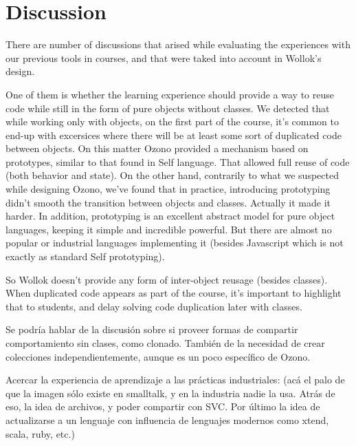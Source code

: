 \section{Discussion}
\label{sec:discussion}

There are number of discussions that arised while evaluating the experiences
with our previous tools in courses, and that were taked into account in Wollok's
design.

One of them is whether the learning experience should provide a way to reuse
code while still in the form of pure objects without classes.
We detected that while working only with objects, on the first part of the
course, it's common to end-up with excersices where there will be at least some
sort of duplicated code between objects.
On this matter Ozono provided a mechanism based on prototypes, similar to that
found in Self language\cite{Ungar87self:the, Ungar91organizingprograms}. That
allowed full reuse of code (both behavior and state).
On the other hand, contrarily to what we suspected while designing Ozono, we've
found that in practice, introducing prototyping didn't smooth the transition
between objects and classes. Actually it made it harder.
In addition, prototyping is an excellent abstract model for pure object
languages, keeping it simple and incredible powerful. But there are almost no popular or industrial
languages implementing it (besides Javascript which is not exactly as standard
Self prototyping). 


So Wollok doesn't provide any form of inter-object reusage (besides classes).
When duplicated code appears as part of the course, it's important to
highlight that to students, and delay solving code duplication later with
classes.

\medskip


Se podría hablar de la discusión sobre si proveer formas de compartir comportamiento sin clases, como clonado.
También de la necesidad de crear colecciones independientemente, aunque es un poco específico de Ozono.

\medskip
Acercar la experiencia de aprendizaje a las prácticas industriales: 
(acá el palo de que la imagen sólo existe en smalltalk, y en la industria nadie la usa. 
Atrás de eso, la idea de archivos, y poder compartir con SVC. Por último la idea de actualizarse a un lenguaje con influencia de lenguajes modernos como xtend, scala, ruby, etc.)


